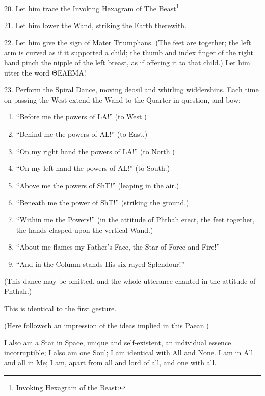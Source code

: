 20. Let him trace the Invoking Hexagram of The Beast\footnote{Invoking Hexagram of the Beast: }.

21. Let him lower the Wand, striking the Earth therewith.

22. Let him give the sign of Mater Triumphans. (The feet are together; the left arm is curved as if it supported a child; the thumb and index finger of the right hand pinch the nipple of the left breast, as if offering it to that child.) Let him utter the word \textgreek{ΘΕΛΕΜΑ}!

23. Perform the Spiral Dance, moving deosil and whirling widdershins. Each time on passing the West extend the Wand to the Quarter in question, and bow:

\begin{enumerate}[label=\alph*.]
\item \enquote{Before me the powers of LA!} (to West.)
\item \enquote{Behind me the powers of AL!} (to East.)
\item \enquote{On my right hand the powers of LA!} (to North.)
\item \enquote{On my left hand the powers of AL!} (to South.)
\item \enquote{Above me the powers of ShT!} (leaping in the air.)
\item \enquote{Beneath me the power of ShT!} (striking the ground.)
\item \enquote{Within me the Powers!} (in the attitude of Phthah erect, the feet together, the hands clasped upon the vertical Wand.)
\item \enquote{About me flames my Father's Face, the Star of Force and Fire!}
\item \enquote{And in the Column stands His six-rayed Splendour!}
\end{enumerate}

(This dance may be omitted, and the whole utterance chanted in the attitude of Phthah.)


This is identical to the first gesture.

\raggedbottom\pagebreak

(Here followeth an impression of the ideas implied in this Paean.)


I also am a Star in Space, unique and self-existent, an individual
essence incorruptible; I also am one Soul; I am identical with All
and None. I am in All and all in Me; I am, apart from all and
lord of all, and one with all.

